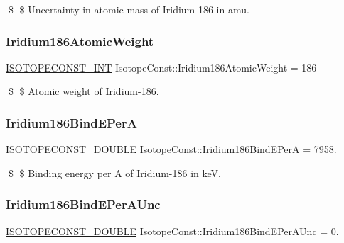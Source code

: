 \$ \$ Uncertainty in atomic mass of Iridium-\/186 in amu. \mbox{\label{group___isotope_const-_iridium-_ir186_ga9c9423c977e6a657185536e40853b547}} 
\subsubsection{\texorpdfstring{Iridium186\+Atomic\+Weight}{Iridium186AtomicWeight}}
{\footnotesize\ttfamily \mbox{\hyperlink{group___isotope_const-_macros_ga5f18360b3e99483a35c32d789e62621c}{I\+S\+O\+T\+O\+P\+E\+C\+O\+N\+S\+T\+\_\+\+I\+NT}} Isotope\+Const\+::\+Iridium186\+Atomic\+Weight = 186}

\$ \$ Atomic weight of Iridium-\/186. \mbox{\label{group___isotope_const-_iridium-_ir186_gafbbf209d076b0cbdefac9e1b708ad774}} 
\subsubsection{\texorpdfstring{Iridium186\+Bind\+E\+PerA}{Iridium186BindEPerA}}
{\footnotesize\ttfamily \mbox{\hyperlink{group___isotope_const-_macros_ga8f45a7272ce02c0b4c65c44636ed719a}{I\+S\+O\+T\+O\+P\+E\+C\+O\+N\+S\+T\+\_\+\+D\+O\+U\+B\+LE}} Isotope\+Const\+::\+Iridium186\+Bind\+E\+PerA = 7958.}

\$ \$ Binding energy per A of Iridium-\/186 in keV. \mbox{\label{group___isotope_const-_iridium-_ir186_ga193227cdb60ed31e2224d6bf682c4ea2}} 
\subsubsection{\texorpdfstring{Iridium186\+Bind\+E\+Per\+A\+Unc}{Iridium186BindEPerAUnc}}
{\footnotesize\ttfamily \mbox{\hyperlink{group___isotope_const-_macros_ga8f45a7272ce02c0b4c65c44636ed719a}{I\+S\+O\+T\+O\+P\+E\+C\+O\+N\+S\+T\+\_\+\+D\+O\+U\+B\+LE}} Isotope\+Const\+::\+Iridium186\+Bind\+E\+Per\+A\+Unc = 0.}

